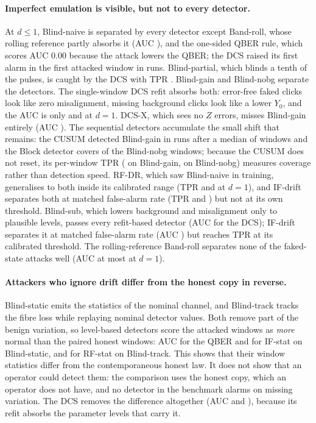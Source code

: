 \paragraph{Imperfect emulation is visible, but not to every detector.} At $d\leq1$, Blind-naive is separated by every detector except Band-roll, whose rolling reference partly absorbs it (AUC \aucNaiveBandrollDOne), and the one-sided QBER rule, which scores AUC 0.00 because the attack lowers the QBER; the DCS raised its first alarm in the first attacked window in \detNaiveDCS{} runs. Blind-partial, which blinds a tenth of the pulses, is caught by the DCS with TPR \tprPartialDCSDOne. Blind-gain and Blind-nobg separate the detectors. The single-window DCS refit absorbs both: error-free faked clicks look like zero misalignment, missing background clicks look like a lower $Y_0$, and the AUC is only \aucGainDCSDOne{} and \aucNodarkDCSDOne{} at $d=1$. DCS-X, which sees no $Z$ errors, misses Blind-gain entirely (AUC \aucGainDCSXDOne). The sequential detectors accumulate the small shift that remains: the CUSUM detected Blind-gain in \detGainCUSUM{} runs after a median of \delayGainCUSUMMed{} windows and the Block detector covers \tprNodarkBlockDOne{} of the Blind-nobg windows; because the CUSUM does not reset, its per-window TPR (\tprGainCUSUMDOne{} on Blind-gain, \tprNodarkCUSUMDOne{} on Blind-nobg) measures coverage rather than detection speed. RF-DR, which saw Blind-naive in training, generalises to both inside its calibrated range (TPR \tprGainRFDRDOne{} and \tprNodarkRFDRDOne{} at $d=1$), and IF-drift separates both at matched false-alarm rate (TPR \tprOrGainIFdriftDOne{} and \tprOrNodarkIFdriftDOne) but not at its own threshold. Blind-sub, which lowers background and misalignment only to plausible levels, passes every refit-based detector (AUC \aucSubDCSDOne{} for the DCS); IF-drift separates it at matched false-alarm rate (AUC \aucSubIFdriftDOne) but reaches TPR \tprSubIFdriftDOne{} at its calibrated threshold. The rolling-reference Band-roll separates none of the faked-state attacks well (AUC at most \aucNodarkBandrollDOne{} at $d=1$).

\paragraph{Attackers who ignore drift differ from the honest copy in reverse.} Blind-static emits the statistics of the nominal channel, and Blind-track tracks the fibre loss while replaying nominal detector values. Both remove part of the benign variation, so level-based detectors score the attacked windows as \emph{more} normal than the paired honest windows: AUC \aucStaticQBERDOne{} for the QBER and \aucStaticIFstatDOne{} for IF-stat on Blind-static, and \aucTrackRFstatDOne{} for RF-stat on Blind-track. This shows that their window statistics differ from the contemporaneous honest law. It does not show that an operator could detect them: the comparison uses the honest copy, which an operator does not have, and no detector in the benchmark alarms on missing variation. The DCS removes the difference altogether (AUC \aucStaticDCSDOne{} and \aucTrackDCSDOne), because its refit absorbs the parameter levels that carry it.

